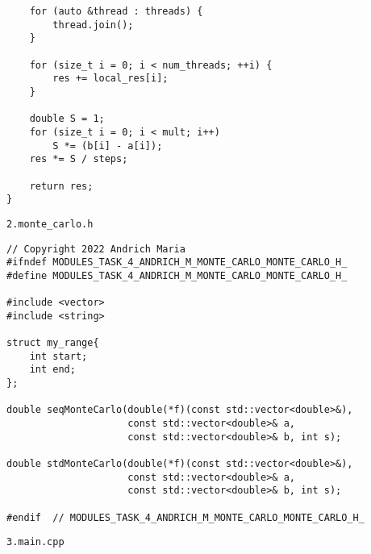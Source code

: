 \documentclass{report}
\begin{document}
\begin{lstlisting}
    for (auto &thread : threads) {
        thread.join();
    }

    for (size_t i = 0; i < num_threads; ++i) {
        res += local_res[i];
    }

    double S = 1;
    for (size_t i = 0; i < mult; i++)
        S *= (b[i] - a[i]);
    res *= S / steps;

    return res;
}
\end{lstlisting}
\par \verb|2.monte_carlo.h|
\begin{lstlisting}
// Copyright 2022 Andrich Maria
#ifndef MODULES_TASK_4_ANDRICH_M_MONTE_CARLO_MONTE_CARLO_H_
#define MODULES_TASK_4_ANDRICH_M_MONTE_CARLO_MONTE_CARLO_H_

#include <vector>
#include <string>

struct my_range{
    int start;
    int end;
};

double seqMonteCarlo(double(*f)(const std::vector<double>&),
                     const std::vector<double>& a,
                     const std::vector<double>& b, int s);

double stdMonteCarlo(double(*f)(const std::vector<double>&),
                     const std::vector<double>& a,
                     const std::vector<double>& b, int s);

#endif  // MODULES_TASK_4_ANDRICH_M_MONTE_CARLO_MONTE_CARLO_H_
\end{lstlisting}
\par \verb|3.main.cpp|
\end{document}
